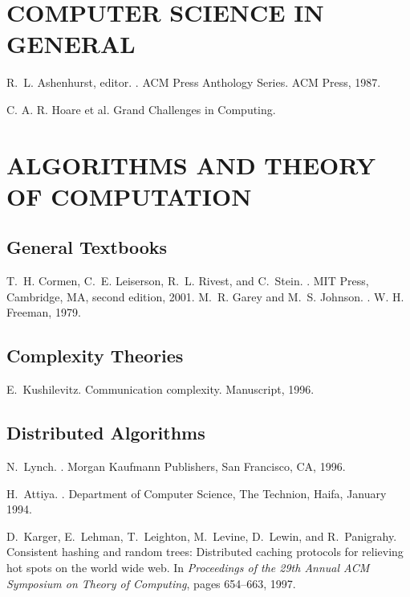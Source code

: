 \documentclass{myproc}
\begin{document}

\section{COMPUTER SCIENCE IN GENERAL}
\bit
\w R.~L. Ashenhurst, editor.
.
\newblock ACM Press Anthology Series. ACM Press, 1987.

\w C. A. R. Hoare et al. Grand Challenges in Computing.
\eit

\section{ALGORITHMS AND THEORY OF COMPUTATION}
\subsection{General Textbooks}
\bit
\w T.~H. Cormen, C.~E. Leiserson, R.~L. Rivest, and C.~Stein.
.
\newblock MIT Press, Cambridge, MA, second edition, 2001.
\w M.~R. Garey and M.~S. Johnson.
.
\newblock W. H. Freeman, 1979.
\eit

\subsection{Complexity Theories}
\bit
\w E.~Kushilevitz.
\newblock Communication complexity.
\newblock Manuscript, 1996.
\eit


\subsection{Distributed Algorithms}
\bit
\w N.~Lynch.
.
\newblock Morgan Kaufmann Publishers, San Francisco, CA, 1996.

\w H.~Attiya.
.
\newblock Department of Computer Science, The Technion, Haifa, January 1994.

\w D.~Karger, E.~Lehman, T.~Leighton, M.~Levine, D.~Lewin, and R.~Panigrahy.
\newblock Consistent hashing and random trees: Distributed caching protocols
  for relieving hot spots on the world wide web.
\newblock In {\em Proceedings of the 29th Annual ACM Symposium on Theory of
  Computing}, pages 654--663, 1997.
\eit
\end{document}
